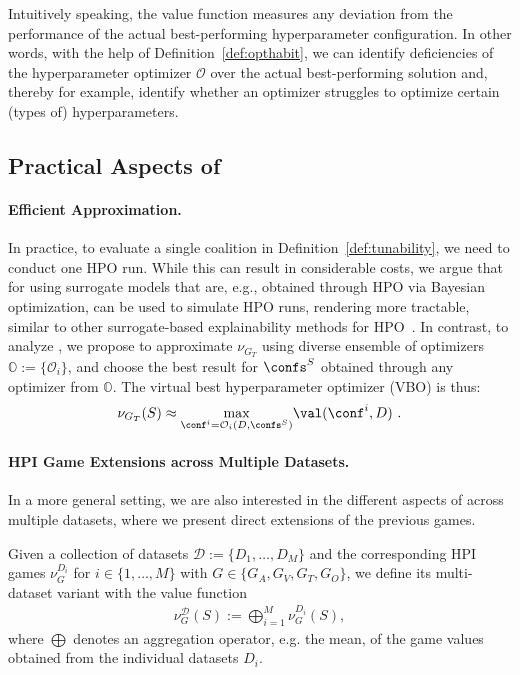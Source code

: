 Intuitively speaking, the value function measures any deviation from the performance of the actual best-performing hyperparameter configuration. 
In other words, with the help of Definition~\ref{def:opthabit}, we can identify deficiencies of the hyperparameter optimizer $\mathcal{O}$ over the actual best-performing solution and, thereby for example, identify whether an optimizer struggles to optimize certain (types of) hyperparameters.

\subsection{Practical Aspects of \tool}\label{sec:hypershap-in-practice}

\paragraph{Efficient Approximation.}
In practice, to evaluate a single coalition in Definition~\ref{def:tunability}, we need to conduct one HPO run.
While this can result in considerable costs, we argue that for \tunability using surrogate models that are, e.g., obtained through HPO via Bayesian optimization, can be used to simulate HPO runs, rendering \tool more tractable, similar to other surrogate-based explainability methods for HPO~\cite{fANOVA,DBLP:conf/aaai/BiedenkappLEHFH17,DBLP:conf/nips/MoosbauerHCLB21,DBLP:conf/automl/SegelGTBL23}.
In contrast, to analyze \opthabit, we propose to approximate $\nu_{G_T}$ using diverse ensemble of optimizers $\mathbb{O}:= \{ \mathcal{O}_i\}$, and choose the best result for $\confs^S$ obtained through any optimizer from $\mathbb{O}$.
The virtual best hyperparameter optimizer (VBO) is thus:
\[
\nu_{G_T}(S) \approx \underset{\conf^i = \mathcal{O}_i(D, \confs^S)}{\max} \val(\conf^i, D) \,\, .
\]


\paragraph{HPI Game Extensions across Multiple Datasets.} 
In a more general setting, we are also interested in the different aspects of \tool across multiple datasets, where we present direct extensions of the previous games.
\begin{definition}
Given a collection of datasets $\mathcal D := \{D_1, \dots, D_M\}$ and the corresponding HPI games $\nu^{D_i}_{G}$ for $i \in \{1,\dots,M\}$ with $G \in \{G_A,G_V,G_T,G_O\}$, we define its multi-dataset variant with the value function
\begin{align*}
    \nu^{\mathcal D}_{G}(S) := \bigoplus_{i = 1 }^M \nu^{D_i}_G(S),
\end{align*}
where $\bigoplus$ denotes an aggregation operator, e.g. the mean, of the game values obtained from the individual datasets $D_i$.
\end{definition}